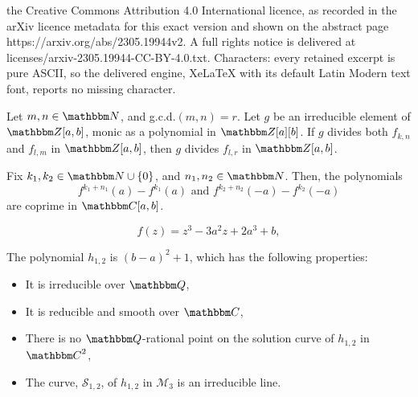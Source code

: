 \documentclass[10pt,a4paper]{amsart}
\newcommand{\C}{{\mathbbm C}}
\newcommand{\N}{{\mathbbm N}}
\newcommand{\Q}{{\mathbbm Q}}
\newcommand{\Z}{{\mathbbm Z}}
\begin{document}
the Creative Commons Attribution 4.0 International licence, as recorded in the arXiv licence metadata for this exact version and shown on the abstract page https://arxiv.org/abs/2305.19944v2. A full rights notice is delivered at licenses/arxiv-2305.19944-CC-BY-4.0.txt. Characters: every retained excerpt is pure ASCII, so the delivered engine, XeLaTeX with its default Latin Modern text font, reports no missing character.
    \begin{lemma}\label{k}
        Let $m,n\in \N$, and g.c.d.$(m,n)=r$. Let $g$ be an irreducible element of $\Z[a,b]$, monic as a polynomial in  $\Z[a][b]$. If $g$ divides both $f_{k,n}$ and $f_{l,m}$ in $\Z[a,b]$, then $g$ divides $f_{l,r}$ in $\Z[a,b]$.
    \end{lemma}

    \begin{theorem}\label{thurs}
        Fix $k_{1},k_{2}\in \N \cup \{0\}$, and $n_{1},n_{2}\in \N$. Then, the polynomials 
        \begin{equation*}
            f^{k_{1}+n_{1}}(a) - f^{k_{1}}(a) \text{ and } f^{k_{2}+n_{2}}(-a) - f^{k_{2}}(-a)
        \end{equation*}
        are coprime in $\C[a,b]$.
    \end{theorem}

    \begin{equation}\label{maineqcopy}
        f(z) = z^{3} - 3a^{2}z + 2a^{3} + b, 
    \end{equation}

    \begin{lemma}\label{h123}
        The polynomial $h_{1,2}$ is $(b-a)^{2}+1$, which has the following properties:
        \begin{itemize}
            \item It is irreducible over $\Q$,
            \item It is reducible and smooth over $\C$,
            \item There is no $\Q$-rational point on the solution curve of $h_{1,2}$ in $\C^{2}$,
            \item The curve, $\mathscr{S}_{1,2}$, of $h_{1,2}$ in $\mathcal{M}_{3}$ is an irreducible line.
        \end{itemize}
    \end{lemma}
\end{document}
